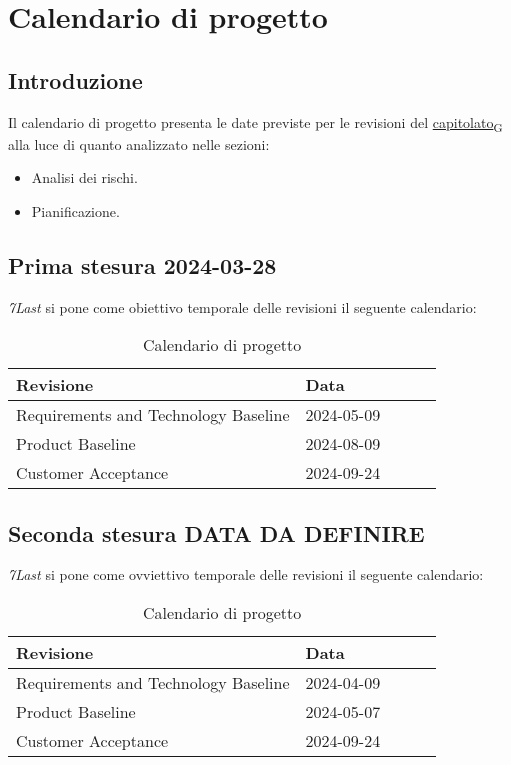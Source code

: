 \section{Calendario di progetto}
\subsection{Introduzione}
Il calendario di progetto presenta le date previste per le revisioni del \href{https://7last.github.io/docs/rtb/documentazione-interna/glossario#capitolato}{capitolato\textsubscript{G}} alla luce di quanto analizzato nelle sezioni:
\begin{itemize}
    \item Analisi dei rischi. 
    \item Pianificazione.
\end{itemize}

\subsection{Prima stesura 2024-03-28}
\textit{7Last} si pone come obiettivo temporale delle revisioni il seguente calendario:
\begin{table}[!h]
    \begin{center}
        \begin{tabular}{ |l |l |l |l| l| }
            \hline 
            Revisione                               & Data       \\ \hline
            Requirements and Technology Baseline    & 2024-05-09 \\
            Product Baseline                        & 2024-08-09 \\
            Customer Acceptance                     & 2024-09-24 \\
            \hline
        \end{tabular}
    \end{center}
    \caption{Calendario di progetto}
    \label{tab:1}
\end{table}
\newpage

\subsection{Seconda stesura DATA DA DEFINIRE}
\textit{7Last} si pone come ovviettivo temporale delle revisioni il seguente calendario:

\begin{table}[!h]
    \begin{center}
        \begin{tabular}{ |l |l |l |l| l| }
            \hline 
            Revisione                               & Data       \\ \hline
            Requirements and Technology Baseline    & 2024-04-09 \\
            Product Baseline                        & 2024-05-07 \\
            Customer Acceptance                     & 2024-09-24 \\
            \hline
        \end{tabular}
    \end{center}
    \caption{Calendario di progetto}
    \label{tab:2}
\end{table}
